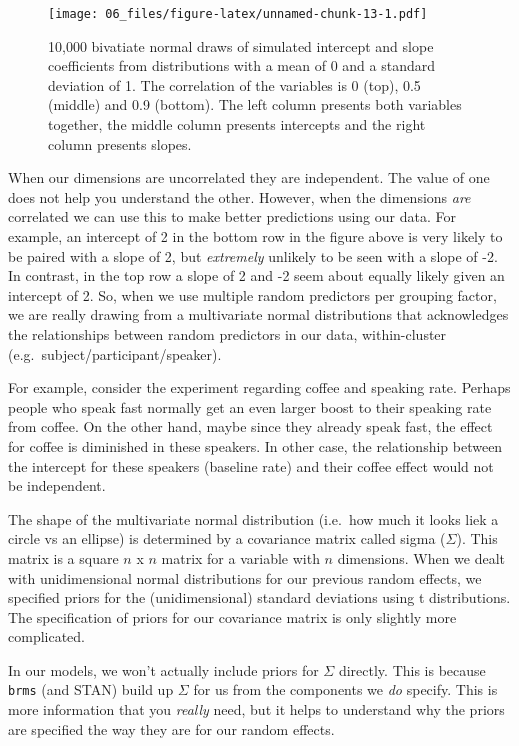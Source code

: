 \documentclass[
]{book}
\begin{document}
\begin{figure}
\centering
\texttt{[image: 06\_files/figure-latex/unnamed-chunk-13-1.pdf]}
\caption{\label{fig:unnamed-chunk-13}10,000 bivatiate normal draws of simulated intercept and slope coefficients from distributions with a mean of 0 and a standard deviation of 1. The correlation of the variables is 0 (top), 0.5 (middle) and 0.9 (bottom). The left column presents both variables together, the middle column presents intercepts and the right column presents slopes.}
\end{figure}

When our dimensions are uncorrelated they are independent. The value of one does not help you understand the other. However, when the dimensions \emph{are} correlated we can use this to make better predictions using our data. For example, an intercept of 2 in the bottom row in the figure above is very likely to be paired with a slope of 2, but \emph{extremely} unlikely to be seen with a slope of -2. In contrast, in the top row a slope of 2 and -2 seem about equally likely given an intercept of 2. So, when we use multiple random predictors per grouping factor, we are really drawing from a multivariate normal distributions that acknowledges the relationships between random predictors in our data, within-cluster (e.g.~subject/participant/speaker).

For example, consider the experiment regarding coffee and speaking rate. Perhaps people who speak fast normally get an even larger boost to their speaking rate from coffee. On the other hand, maybe since they already speak fast, the effect for coffee is diminished in these speakers. In other case, the relationship between the intercept for these speakers (baseline rate) and their coffee effect would not be independent.

The shape of the multivariate normal distribution (i.e.~how much it looks liek a circle vs an ellipse) is determined by a covariance matrix called sigma (\(\Sigma\)). This matrix is a square \(n\) x \(n\) matrix for a variable with \(n\) dimensions. When we dealt with unidimensional normal distributions for our previous random effects, we specified priors for the (unidimensional) standard deviations using t distributions. The specification of priors for our covariance matrix is only slightly more complicated.

In our models, we won't actually include priors for \(\Sigma\) directly. This is because \texttt{brms} (and STAN) build up \(\Sigma\) for us from the components we \emph{do} specify. This is more information that you \emph{really} need, but it helps to understand why the priors are specified the way they are for our random effects.
\end{document}
